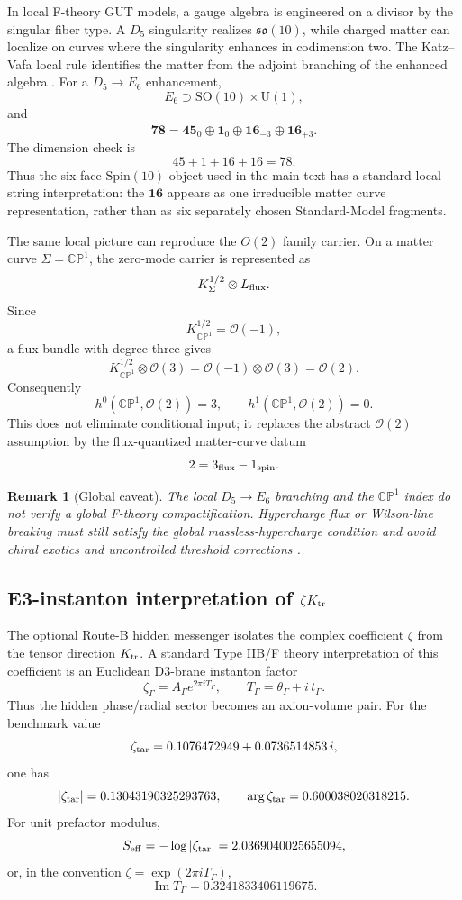 \documentclass[
  aps,
  prd,
  preprint,
  nofootinbib,
  superscriptaddress,
  longbibliography
]{revtex4-2}
\newcommand{\Spin}{\mathrm{Spin}}
\newcommand{\SO}{\mathrm{SO}}
\newcommand{\U}{\mathrm{U}}
\newcommand{\CP}{\mathbb{CP}}
\newcommand{\cO}{\mathcal{O}}
\newtheorem{remark}[theorem]{Remark}
\begin{document}
In local F-theory GUT models, a gauge algebra is engineered on a divisor by
the singular fiber type.  A \(D_5\) singularity realizes
\(\mathfrak{so}(10)\), while charged matter can localize on curves where the
singularity enhances in codimension two.  The Katz--Vafa local rule identifies
the matter from the adjoint branching of the enhanced algebra
\cite{KatzVafa1996,BeasleyHeckmanVafa2008I}.  For a \(D_5\to E_6\)
enhancement,
\[
  E_6\supset \SO(10)\times\U(1),
\]
and
\[
  \mathbf{78}
  =
  \mathbf{45}_0
  \oplus
  \mathbf{1}_0
  \oplus
  \mathbf{16}_{-3}
  \oplus
  \overline{\mathbf{16}}_{+3}.
\]
The dimension check is
\[
  45+1+16+16=78.
\]
Thus the six-face \(\Spin(10)\) object used in the main text has a standard
local string interpretation: the \(\mathbf{16}\) appears as one irreducible
matter curve representation, rather than as six separately chosen
Standard-Model fragments.

The same local picture can reproduce the \(O(2)\) family carrier.  On a
matter curve \(\Sigma=\CP^1\), the zero-mode carrier is represented as
\[
  K_\Sigma^{1/2}\otimes L_{\rm flux}.
\]
Since
\[
  K_{\CP^1}^{1/2}=\cO(-1),
\]
a flux bundle with degree three gives
\[
  K_{\CP^1}^{1/2}\otimes \cO(3)
  =
  \cO(-1)\otimes\cO(3)
  =
  \cO(2).
\]
Consequently
\[
  h^0(\CP^1,\cO(2))=3,\qquad
  h^1(\CP^1,\cO(2))=0.
\]
This does not eliminate conditional input; it replaces the abstract
\(\cO(2)\) assumption by the flux-quantized matter-curve datum
\[
  2=3_{\rm flux}-1_{\rm spin}.
\]

\begin{remark}[Global caveat]
The local \(D_5\to E_6\) branching and the \(\CP^1\) index do not verify a
global F-theory compactification.  Hypercharge flux or Wilson-line breaking
must still satisfy the global massless-hypercharge condition and avoid chiral
exotics and uncontrolled threshold corrections
\cite{BeasleyHeckmanVafa2008II,MayrhoferPaltiWeigand2013}.
\end{remark}

\subsection{E3-instanton interpretation of \texorpdfstring{\(\zeta K_{\rm tr}\)}{zeta Ktr}}

The optional Route-B hidden messenger isolates the complex coefficient
\(\zeta\) from the tensor direction \(K_{\rm tr}\).  A standard Type IIB/F
theory interpretation of this coefficient is an Euclidean D3-brane instanton
factor
\cite{Witten1996,BlumenhagenCveticWeigand2006,IbanezUranga2006,CveticRichterWeigand2007}
\[
  \zeta_\Gamma=A_\Gamma e^{2\pi iT_\Gamma},
  \qquad
  T_\Gamma=\theta_\Gamma+i\,t_\Gamma.
\]
Thus the hidden phase/radial sector becomes an axion-volume pair.  For the
benchmark value
\[
  \zeta_{\rm tar}=0.1076472949+0.0736514853\,i,
\]
one has
\[
  |\zeta_{\rm tar}|=0.13043190325293763,
  \qquad
  \arg\zeta_{\rm tar}=0.600038020318215.
\]
For unit prefactor modulus,
\[
  S_{\rm eff}=-\log|\zeta_{\rm tar}|
  =
  2.0369040025655094,
\]
or, in the convention \(\zeta=\exp(2\pi iT_\Gamma)\),
\[
  \operatorname{Im}T_\Gamma=0.3241833406119675.
\]
\end{document}

